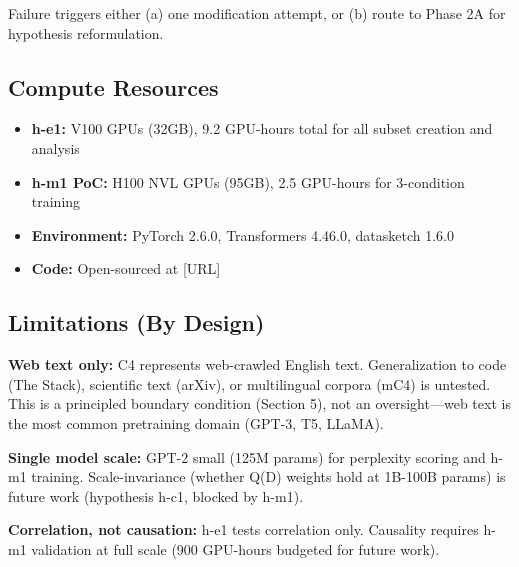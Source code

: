 Failure triggers either (a) one modification attempt, or (b) route to Phase 2A for hypothesis reformulation.

\subsection{Compute Resources}

\begin{itemize}
\item \textbf{h-e1:} V100 GPUs (32GB), 9.2 GPU-hours total for all subset creation and analysis
\item \textbf{h-m1 PoC:} H100 NVL GPUs (95GB), 2.5 GPU-hours for 3-condition training
\item \textbf{Environment:} PyTorch 2.6.0, Transformers 4.46.0, datasketch 1.6.0
\item \textbf{Code:} Open-sourced at [URL]
\end{itemize}

\subsection{Limitations (By Design)}

\textbf{Web text only:} C4 represents web-crawled English text. Generalization to code (The Stack), scientific text (arXiv), or multilingual corpora (mC4) is untested. This is a principled boundary condition (Section 5), not an oversight---web text is the most common pretraining domain (GPT-3, T5, LLaMA).

\textbf{Single model scale:} GPT-2 small (125M params) for perplexity scoring and h-m1 training. Scale-invariance (whether Q(D) weights hold at 1B-100B params) is future work (hypothesis h-c1, blocked by h-m1).

\textbf{Correlation, not causation:} h-e1 tests correlation only. Causality requires h-m1 validation at full scale (900 GPU-hours budgeted for future work).
